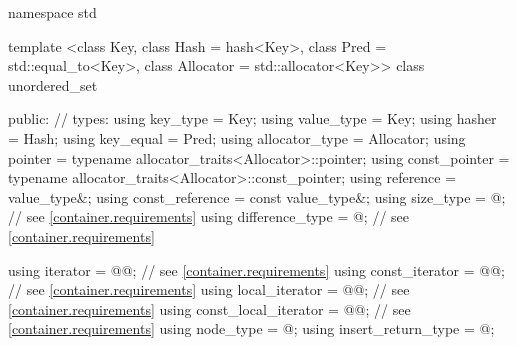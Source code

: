 %
\begin{codeblock}
namespace std {
  template <class Key,
            class Hash = hash<Key>,
            class Pred = std::equal_to<Key>,
            class Allocator = std::allocator<Key>>
  class unordered_set {
  public:
    // types:
    using key_type             = Key;
    using value_type           = Key;
    using hasher               = Hash;
    using key_equal            = Pred;
    using allocator_type       = Allocator;
    using pointer              = typename allocator_traits<Allocator>::pointer;
    using const_pointer        = typename allocator_traits<Allocator>::const_pointer;
    using reference            = value_type&;
    using const_reference      = const value_type&;
    using size_type            = @\impdef@; // see \ref{container.requirements}
    using difference_type      = @\impdef@; // see \ref{container.requirements}

    using iterator             = @@; // see \ref{container.requirements}
    using const_iterator       = @@; // see \ref{container.requirements}
    using local_iterator       = @@; // see \ref{container.requirements}
    using const_local_iterator = @@; // see \ref{container.requirements}
    using node_type            = @\unspec@;
    using insert_return_type   = @\unspec@;

}}
\end{codeblock}
